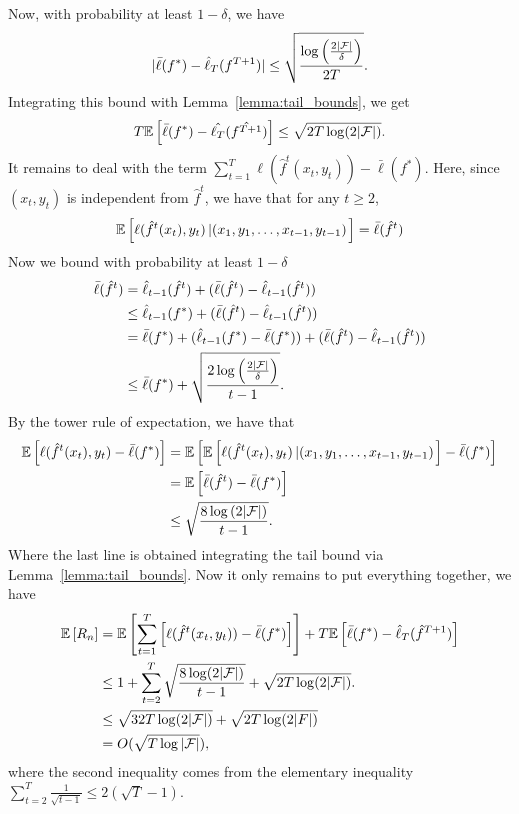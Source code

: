 \begin{solution}[]
Now, with probability at least $ 1- \delta $, we have 
\begin{align*}
	|\bar{\ell}(f^{*}) - \hat{\ell}_T(f^{T+1})| \leq \sqrt{\frac{\log \left( \frac{2 |\mathcal{F}|}{\delta} \right)}{2T}} .
\end{align*}
Integrating this bound with Lemma~\ref{lemma:tail_bounds}, we get 
\begin{equation*}
	T \mathbb{E}\left[\bar{\ell}(f^{*})- \hat{\ell_T}(\hat{f^{T+1}})\right] \leq \sqrt{2T \log (2|\mathcal{F}|)}.
\end{equation*}
It remains to deal with the term $ \sum_{t=1}^{T}\ell(\hat{f}^t(x_t,y_t)) - \bar{\ell}(f^{*}) $. Here, since $ (x_t,y_t)$
is independent from $ \hat{f}^t $, we have that for any $ t\geq 2 $,
\begin{equation*}
	\mathbb{E}\left[\ell(\hat{f}^t(x_t),y_t)\left|(x_1,y_1,\ldots, x_{t-1},y_{t-1})\right.\right] = \bar{\ell}(\hat{f}^t)
\end{equation*}
Now we bound with probability at least $ 1 - \delta $
\begin{align*}
	\bar{\ell}(\hat{f}^{t}) &= \hat{\ell}_{t-1}(\hat{f}^{t}) + (\bar{\ell}(\hat{f}^{t})- \hat{\ell}_{t-1}(\hat{f}^{t}))\\
				&\leq \hat{\ell}_{t-1}(f^{*}) +(\bar{\ell}(\hat{f}^{t})- \hat{\ell}_{t-1}(\hat{f}^{t}))\\
				&= \bar{\ell}(f^{*}) + (\hat{\ell}_{t-1}(f^{*})- \bar{\ell}(f^{*})) +(\bar{\ell}(\hat{f}^{t})- \hat{\ell}_{t-1}(\hat{f}^{t}))\\
				&\leq \bar{\ell}(f^{*}) + \sqrt{\frac{2\log \left( \frac{2 |\mathcal{F}|}{\delta} \right)}{t-1}}.
\end{align*}
By the tower rule of expectation, we have that
\begin{align*}
	\mathbb{E}\left[\ell(\hat{f}^{t}(x_t),y_t) - \bar{\ell}(f^{*})\right] &= \mathbb{E}\left[\mathbb{E}\left[\ell(\hat{f}^t(x_t),y_t)\left|(x_1,y_1,\ldots,
	x_{t-1},y_{t-1})\right.\right] - \bar{\ell}(f^{*})\right]\\
							    &= \mathbb{E}\left[\bar{\ell}(\hat{f}^{t}) - \bar{\ell}(f^{*})\right]\\
							    &\leq \sqrt{\frac{8\log \left( 2 |\mathcal{F}|
						    \right)}{t-1}}.
\end{align*}
Where the last line is obtained integrating the tail bound via Lemma~\ref{lemma:tail_bounds}.
Now it only remains to put everything together, we have 
\begin{align*}
	\mathbb{E}\left[R_n\right] &= \mathbb{E}\left[\sum_{t=1}^{T}\left[\ell(\hat{f}^t(x_t,y_t)) - \bar{\ell}(f^{*})\right]\right] + T\mathbb{E}\left[\bar{\ell}(f^{*})-
		 \hat{\ell}_T(\hat{f}^{T+1})\right]\\
		 &\leq 1 + \sum_{t=2}^{T} \sqrt{\frac{8 \log (2|\mathcal{F}|)}{t-1}} + \sqrt{2T\log(2|\mathcal{F}|)}.\\
		 &\leq \sqrt{32T\log(2|\mathcal{F}|)} + \sqrt{2T\log(2 |F|)}\\
		 &= O(\sqrt{T\log|\mathcal{F}|}),
\end{align*}
where the second inequality comes from the elementary inequality $ \sum_{t=2}^{T} \frac{1}{\sqrt{t-1}} \leq 2(\sqrt{T}
-1) $.
\end{solution}
